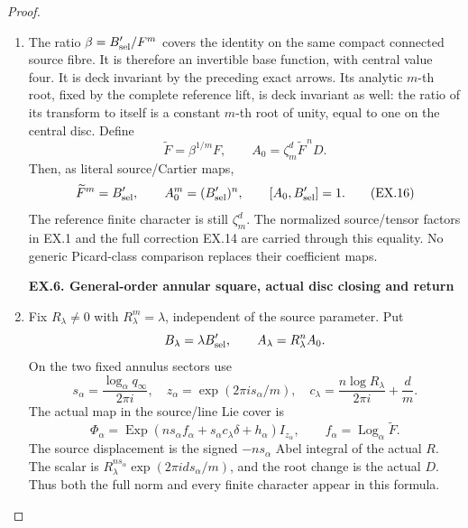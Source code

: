 \begin{proof}
\begin{enumerate}[label=\arabic*.]
\item The ratio \(\beta=B'_{{\rm sel}}/F^m\) covers the identity
on the same compact connected source fibre. It is therefore
an invertible base function, with central value four. It is
deck invariant by the preceding exact arrows. Its analytic
\(m\)-th root, fixed by the complete reference lift, is deck
invariant as well: the ratio of its transform to itself is a
constant \(m\)-th root of unity, equal to one on the central
disc. Define
\[
 \widetilde F=\beta^{1/m}F,\qquad
 A_0=\zeta_m^d\widetilde F^{\,n}D.
\]
Then, as literal source/Cartier maps,
\[
 \widetilde F^m=B'_{{\rm sel}},\qquad
 A_0^m=(B'_{{\rm sel}})^n,\qquad
 [A_0,B'_{{\rm sel}}]=1.
 \tag{EX.16}
\]
The reference finite character is still \(\zeta_m^d\).
The normalized source/tensor factors in EX.1 and the full
correction EX.14 are carried through this equality. No generic
Picard-class comparison replaces their coefficient maps.

\par

\medskip\noindent\textbf{EX.6. General-order annular square, actual disc closing and return}

\par\nobreak

\item Fix \(R_\lambda\ne0\) with \(R_\lambda^m=\lambda\),
independent of the source parameter. Put
\[
 B_\lambda=\lambda B'_{{\rm sel}},\qquad
 A_\lambda=R_\lambda^n A_0.
\]
On the two fixed annulus sectors use
\[
 s_\alpha=\frac{\log_\alpha q_\infty}{2\pi i},\quad
 z_\alpha=\exp(2\pi i s_\alpha/m),\quad
 c_\lambda=\frac{n\log R_\lambda}{2\pi i}+\frac dm.
\]
The actual map in the source/line Lie cover is
\[
 \Phi_\alpha=\operatorname{Exp}
       (n s_\alpha f_\alpha+s_\alpha c_\lambda\delta
                   +h_\alpha)I_{z_\alpha},
 \qquad f_\alpha=\operatorname{Log}_\alpha\widetilde F.
 \tag{EX.17}
\]
The source displacement is the signed \(-n s_\alpha\) Abel
integral of the actual \(R\). The scalar is
\(R_\lambda^{n s_\alpha}\exp(2\pi i d s_\alpha/m)\),
and the root change is the actual \(D\). Thus both the full
norm and every finite character appear in this formula.


\end{enumerate}
\end{proof}
